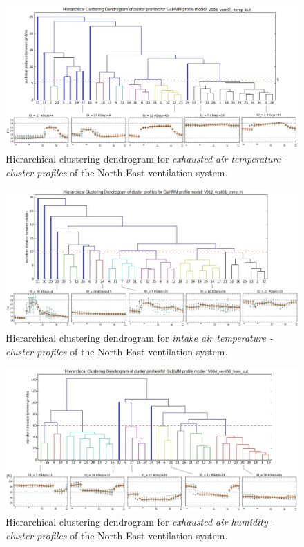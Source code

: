 \begin{landscape}
\begin{figure}[h!]
  \vspace{0.5em} %
  \includegraphics[scale=0.78]{Figures/dendogram_temperature_exhaust_air_NE.jpg}
  \caption{Hierarchical clustering dendrogram for \textit{exhausted air temperature - cluster profiles} of  
  the North-East ventilation system.}
  \label{fig:dendrogram_exhausted_NE}
\end{figure}

\begin{figure}[h!]
  \vspace{0.5em} %
  \includegraphics[scale=0.78]{Figures/Dendrogram_temperature_intake_NE.jpg}
  \caption{Hierarchical clustering dendrogram for \textit{intake air temperature - cluster profiles} of the North-East ventilation system.}
  \label{fig:dendrogram_intake_NE}
\end{figure}

\begin{figure}[h!]
  \vspace{0.5em} %
  \includegraphics[scale=0.78]{Figures/dendrogram_humidity_out_NE.jpg}
  \caption{Hierarchical clustering dendrogram for \textit{exhausted air humidity - cluster profiles} of  
  the North-East ventilation system.}
  \label{fig:dendrogram_exhausted_humidity_NE}
\end{figure}


\end{landscape}
